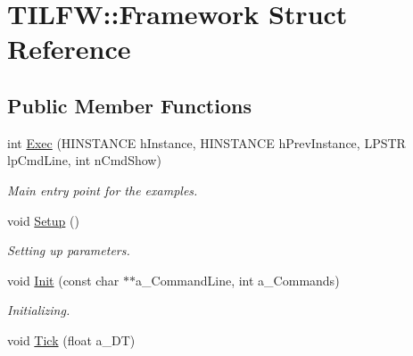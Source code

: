 \hypertarget{struct_t_i_l_f_w_1_1_framework}{
\section{TILFW::Framework Struct Reference}
\label{struct_t_i_l_f_w_1_1_framework}
}
\subsection*{Public Member Functions}
\begin{DoxyCompactItemize}
\item 
\hypertarget{struct_t_i_l_f_w_1_1_framework_ae741a615824b09b039531c1ecd0c4ebe}{
int \hyperlink{struct_t_i_l_f_w_1_1_framework_ae741a615824b09b039531c1ecd0c4ebe}{Exec} (HINSTANCE hInstance, HINSTANCE hPrevInstance, LPSTR lpCmdLine, int nCmdShow)}
\label{struct_t_i_l_f_w_1_1_framework_ae741a615824b09b039531c1ecd0c4ebe}

\begin{DoxyCompactList}\small\item\em Main entry point for the examples. \item\end{DoxyCompactList}\item 
\hypertarget{struct_t_i_l_f_w_1_1_framework_a2416aef2383b7d879a9c249b1a303641}{
void \hyperlink{struct_t_i_l_f_w_1_1_framework_a2416aef2383b7d879a9c249b1a303641}{Setup} ()}
\label{struct_t_i_l_f_w_1_1_framework_a2416aef2383b7d879a9c249b1a303641}

\begin{DoxyCompactList}\small\item\em Setting up parameters. \item\end{DoxyCompactList}\item 
\hypertarget{struct_t_i_l_f_w_1_1_framework_a35b3f67924bad5512ed4e279f1ad91aa}{
void \hyperlink{struct_t_i_l_f_w_1_1_framework_a35b3f67924bad5512ed4e279f1ad91aa}{Init} (const char $\ast$$\ast$a\_\-CommandLine, int a\_\-Commands)}
\label{struct_t_i_l_f_w_1_1_framework_a35b3f67924bad5512ed4e279f1ad91aa}

\begin{DoxyCompactList}\small\item\em Initializing. \item\end{DoxyCompactList}\item 
\hypertarget{struct_t_i_l_f_w_1_1_framework_a42420a83c470902e957af36baddd53ee}{
void \hyperlink{struct_t_i_l_f_w_1_1_framework_a42420a83c470902e957af36baddd53ee}{Tick} (float a\_\-DT)}
\label{struct_t_i_l_f_w_1_1_framework_a42420a83c470902e957af36baddd53ee}


\end{DoxyCompactItemize}
